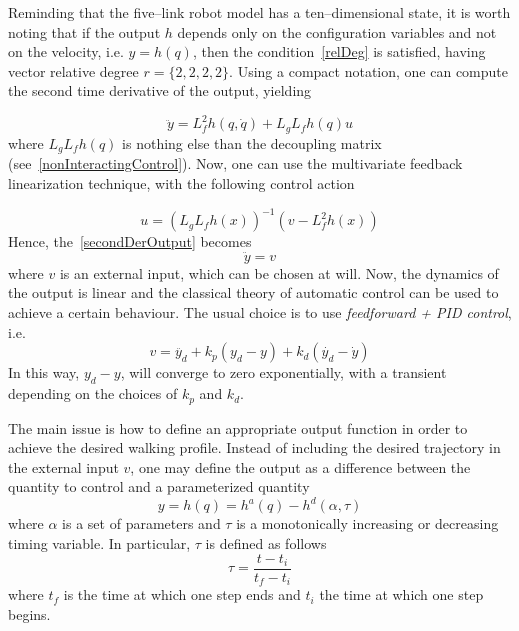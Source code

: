 \documentclass[11pt]{article}
\begin{document}
Reminding that the five--link robot model has a ten--dimensional state, it is worth noting that if the output $h$ depends only on the configuration variables and not on the velocity, i.e. $y = h(q)$, then the condition~\eqref{relDeg} is satisfied, having vector relative degree $r = \{2,2,2,2\}$. Using a compact notation, one can compute the second time derivative of the output, yielding

\begin{equation}
    \ddot{y} = L_f^2h(q,\dot{q}) + L_gL_fh(q)u
    \label{secondDerOutput}
\end{equation}
where $L_gL_fh(q)$ is nothing else than the decoupling matrix (see~\eqref{nonInteractingControl}). Now, one can use the multivariate feedback linearization technique, with the following control action

\begin{equation}
    u = (L_gL_fh(x))^{-1}(v-L_f^2h(x))
    \label{feedbackLinerizationControl}
\end{equation}
Hence, the~\eqref{secondDerOutput} becomes
\begin{equation}
    \ddot{y} = v
\end{equation}
where $v$ is an external input, which can be chosen at will. Now, the dynamics of the output is linear and the classical theory of automatic control can be used to achieve a certain behaviour. The usual choice is to use \textit{feedforward + PID control}, i.e.
\begin{equation}
    v = \ddot{y_d} + k_p(y_d-y) + k_d(\dot{y_d} - \dot{y})
    \label{externalInput}
\end{equation}
In this way, $y_d-y$, will converge to zero exponentially, with a transient depending on the choices of $k_p$ and $k_d$.

The main issue is how to define an appropriate output function in order to achieve the desired walking profile. Instead of including the desired trajectory in the external input $v$, one may define the output as a difference between the quantity to control and a parameterized quantity
\begin{equation}
    y = h(q) = h^a(q) - h^d(\alpha,\tau)
    \label{systemOutput}
\end{equation}
where $\alpha$ is a set of parameters and $\tau$ is a monotonically increasing or decreasing timing variable. In particular, $\tau$ is defined as follows
\[
\tau = \dfrac{t - t_i}{t_f - t_i}
\]
where $t_f$ is the time at which one step ends and $t_i$ the time at which one step begins.
\end{document}
